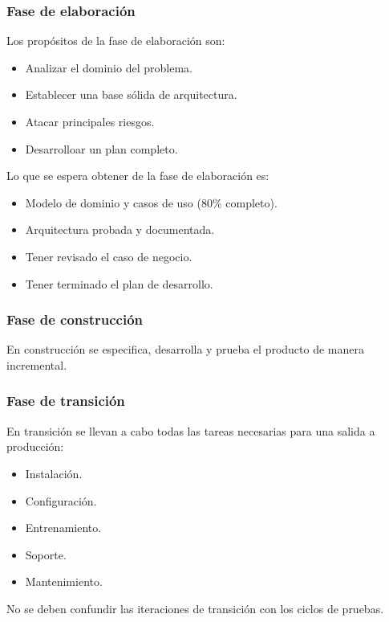 \documentclass[]{article}
\begin{document}
\subsubsection{Fase de elaboración}
Los propósitos de la fase de elaboración son:
\begin{itemize}
	\item Analizar el dominio del problema.
	\item Establecer una base sólida de arquitectura.
	\item Atacar principales riesgos.
	\item Desarrolloar un plan completo.
\end{itemize}


Lo que se espera obtener de la fase de elaboración es:
\begin{itemize}
	\item Modelo de dominio y casos de uso (80\% completo).
	\item Arquitectura probada y documentada.
	\item Tener revisado el caso de negocio.
	\item Tener terminado el plan de desarrollo.
\end{itemize}


\subsubsection{Fase de construcción}
En construcción se especifica, desarrolla y prueba el producto de manera incremental.

\subsubsection{Fase de transición}
En transición se llevan a cabo todas las tareas necesarias para una salida a producción:
\begin{itemize}
	\item Instalación.
	\item Configuración.
	\item Entrenamiento.
	\item Soporte.
	\item Mantenimiento.
\end{itemize}

No se deben confundir las iteraciones de transición con los ciclos de pruebas.
\end{document}

